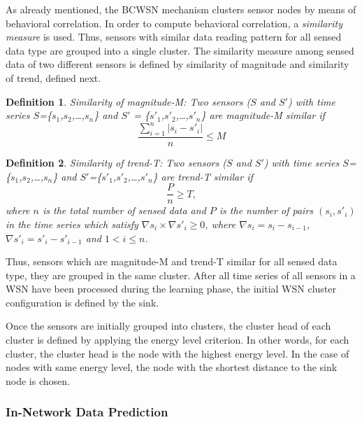 \documentclass{acm_proc_article-sp}
\begin{document}
As already mentioned, the BCWSN mechanism clusters sensor nodes by means of
behavioral correlation. In order to compute behavioral correlation, a
\textit{similarity measure} \cite{Liu2007} is used. Thus, sensors with similar
data reading pattern for all sensed data type are grouped into a single cluster.
The similarity measure among sensed data of two different sensors is defined by 
similarity of magnitude and similarity of trend, defined next.

\newtheorem{defini}{Definition}

\begin{defini}
Similarity of magnitude-M: Two sensors ($S$ and $S'$) with time series
$S$=\{$s_{1}$,$s_{2}$,\ldots,$s_{n}$\} and
$S'$ = \{$s'_{1}$,$s'_{2}$,\ldots,$s'_{n}$\} are magnitude-M similar if 
\begin{equation}
\label{equ:magni}
\frac{\sum_{i=1}^{n} |s_{i}-s'_{i}|}{n} \leq M
\end{equation}
\end{defini}

\begin{defini}
Similarity of trend-T: Two sensors ($S$ and $S'$) with time series
$S$=\{$s_{1}$,$s_{2}$,\ldots,$s_{n}$\} and
$S'$=\{$s'_{1}$,$s'_{2}$,\ldots,$s'_{n}$\} are trend-T similar if 
\begin{equation}
\label{equ:trend}
\frac{P}{n} \geq T,
\end{equation}
where $n$ is the total number of sensed data and $P$ is the number of pairs
$(s_{i},s'_{i})$ in the time series which satisfy $\nabla s_{i} \times \nabla
s'_{i} \geq 0$, where $\nabla s_{i} = s_{i} - s_{i-1}$, $\nabla
s'_{i} = s'_{i} - s'_{i-1}$ and $1 < i \leq n$.
\end{defini}

Thus, sensors which are magnitude-M and trend-T similar for all sensed data
type, they are grouped in the same cluster. After all time series of all sensors
in a WSN have been processed during the learning phase, the initial WSN cluster
configuration is defined by the sink.

Once the sensors are initially grouped into clusters, the cluster head of each
cluster is defined by applying the energy level criterion.
In other words, for each cluster, the cluster head is the node with the highest
energy level. In the case of nodes with same energy level, the node with the
shortest distance to the sink node is chosen.


\subsubsection{In-Network Data Prediction}
\label{data-predict}
\end{document}
